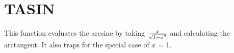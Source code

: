 \section{TASIN}
\label{sect:tasin}

\noindent This function evaluates the arcsine by taking ${x \over \sqrt{1 -
x^2}}$ and calculating the arctangent. It also traps for the special case of
$x$ = 1.\\
